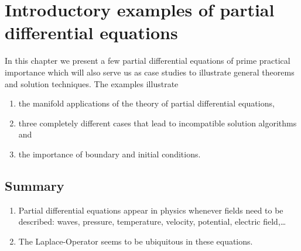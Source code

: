 %
%
%
\chapter{Introductory examples of partial differential equations
\label{chapter:examples}}
In this chapter we present a few partial differential equations
of prime practical importance which will also serve us as case
studies to illustrate general theorems and solution techniques.
The examples illustrate
\begin{enumerate}
\item
the manifold applications of the theory of partial differential equations,
\item
three completely different cases that lead to incompatible solution
algorithms and
\item
the importance of boundary and initial conditions.
\end{enumerate}








\section{Summary\label{examples:summary}}
\begin{enumerate}
\item 
Partial differential equations appear in physics whenever fields need
to be described: waves, pressure, temperature, velocity, potential,
electric field,\dots
\item
The Laplace-Operator seems to be ubiquitous in these equations.
\end{enumerate}
